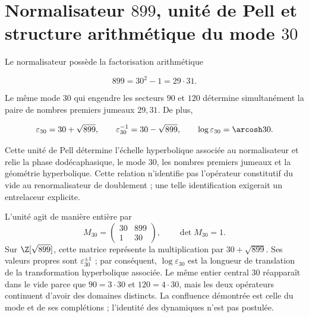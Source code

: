 \section{Normalisateur \(899\), unité de Pell et structure arithmétique du mode \(30\)}

Le normalisateur possède la factorisation arithmétique

\begin{equation}
899=30^2-1=29\cdot31.
\label{mab:rm:eq:899}
\end{equation}

Le même mode \(30\) qui engendre les secteurs \(90\) et \(120\) détermine
simultanément la paire de nombres premiers jumeaux \(29,31\). De plus,

\begin{equation}
\varepsilon_{30}=30+\sqrt{899},\qquad
\varepsilon_{30}^{-1}=30-\sqrt{899},\qquad
\log\varepsilon_{30}=\arcosh30.
\label{mab:rm:eq:pell30}
\end{equation}

Cette unité de Pell détermine l’échelle hyperbolique associée au
normalisateur et relie la phase dodécaphasique, le mode \(30\), les nombres premiers
jumeaux et la géométrie hyperbolique. Cette relation n’identifie pas
l’opérateur constitutif du vide au renormalisateur de doublement ; une telle
identification exigerait un entrelaceur explicite.

L’unité agit de manière entière par
\begin{equation}
M_{30}=\begin{pmatrix}30&899\\1&30\end{pmatrix},
\qquad \det M_{30}=1.
\label{mab:rm:eq:pell-matrix30}
\end{equation}
Sur \(\Z[\sqrt{899}]\), cette matrice représente la multiplication par
\(30+\sqrt{899}\). Ses valeurs propres sont \(\varepsilon_{30}^{\pm1}\) ; par
conséquent, \(\log\varepsilon_{30}\) est la longueur de translation de la transformation
hyperbolique associée. Le même entier central \(30\) réapparaît dans le vide
parce que \(90=3\cdot30\) et \(120=4\cdot30\), mais les deux opérateurs continuent
d’avoir des domaines distincts. La confluence démontrée est celle du mode et de ses
complétions ; l’identité des dynamiques n’est pas postulée.

